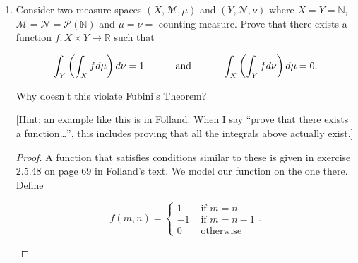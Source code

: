 \documentclass[11pt,oneside,english]{amsart}
\theoremstyle{definition}
\newcommand{\pspace}{\hspace{10mm}}
\newcommand{\R}{\mathbb{R}}
\begin{document}
\rightline{\today}



\vspace{5mm}
\begin{enumerate}
\itemsep7mm

\item Consider two measure spaces $(X,\mathcal{M},\mu)$ and $(Y,\mathcal{N},\nu)$ where $X=Y=\mathbb{N}$, $\mathcal{M}=\mathcal{N}=\mathcal{P}(\mathbb{N})$ and $\mu=\nu=$ counting measure.   Prove that there exists a function $f:X \times Y \to \R$ such that 

\[
\int_Y \left(\int_X f d \mu\right)  d\nu = 1\pspace \text{ and } \pspace \int_X \left(\int_Y f d\nu \right)  d\mu =0.
\]

Why doesn't this violate Fubini's Theorem?

[Hint: an example like this is in Folland.  When I say ``prove that there exists a function\ldots'', this includes proving that all the integrals above actually exist.]

\begin{proof}
A function that satisfies conditions similar to these is given in exercise 2.5.48 on page 69 in Folland's text. We model our function on the one there. Define

\begin{multicols}{2}
\[
f(m,n)=\begin{cases}1 & \text{ if }m=n\\ -1 & \text{ if } m=n-1\\ 0 & \text{ otherwise}\end{cases}.
\]


\columnbreak

\end{multicols}
\end{proof}
\end{enumerate}
\end{document}
